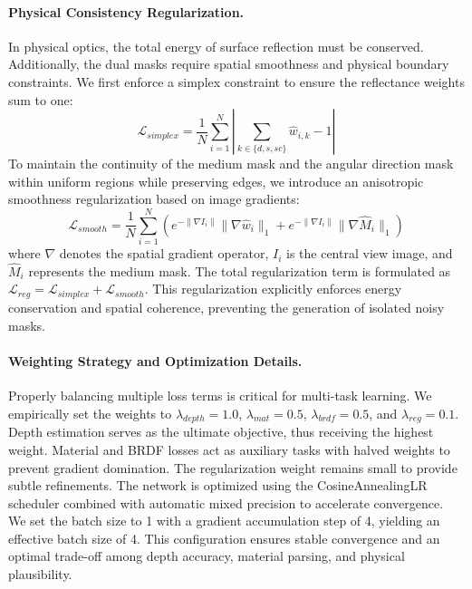 \documentclass[lettersize,journal]{IEEEtran}
\begin{document}
\paragraph{Physical Consistency Regularization.}
In physical optics, the total energy of surface reflection must be conserved. Additionally, the dual masks require spatial smoothness and physical boundary constraints. We first enforce a simplex constraint to ensure the reflectance weights sum to one:
\begin{equation}
\label{eq:eq15}
\mathcal{L}_{simplex} = \frac{1}{N} \sum_{i=1}^{N} \left| \sum_{k \in \{d, s, sc\}} \hat{w}_{i,k} - 1 \right|
\end{equation}
To maintain the continuity of the medium mask and the angular direction mask within uniform regions while preserving edges, we introduce an anisotropic smoothness regularization based on image gradients:
\begin{equation}
\label{eq:eq16}
\mathcal{L}_{smooth} = \frac{1}{N} \sum_{i=1}^{N} \left( e^{-\|\nabla I_i\|} \|\nabla \hat{w}_i\|_1 + e^{-\|\nabla I_i\|} \|\nabla \hat{M}_i\|_1 \right)
\end{equation}
where $\nabla$ denotes the spatial gradient operator, $I_i$ is the central view image, and $\hat{M}_i$ represents the medium mask. The total regularization term is formulated as $\mathcal{L}_{reg} = \mathcal{L}_{simplex} + \mathcal{L}_{smooth}$. This regularization explicitly enforces energy conservation and spatial coherence, preventing the generation of isolated noisy masks.

\paragraph{Weighting Strategy and Optimization Details.}
Properly balancing multiple loss terms is critical for multi-task learning. We empirically set the weights to $\lambda_{depth} = 1.0$, $\lambda_{mat} = 0.5$, $\lambda_{brdf} = 0.5$, and $\lambda_{reg} = 0.1$. Depth estimation serves as the ultimate objective, thus receiving the highest weight. Material and BRDF losses act as auxiliary tasks with halved weights to prevent gradient domination. The regularization weight remains small to provide subtle refinements. The network is optimized using the CosineAnnealingLR scheduler combined with automatic mixed precision to accelerate convergence. We set the batch size to 1 with a gradient accumulation step of 4, yielding an effective batch size of 4. This configuration ensures stable convergence and an optimal trade-off among depth accuracy, material parsing, and physical plausibility.
\end{document}
